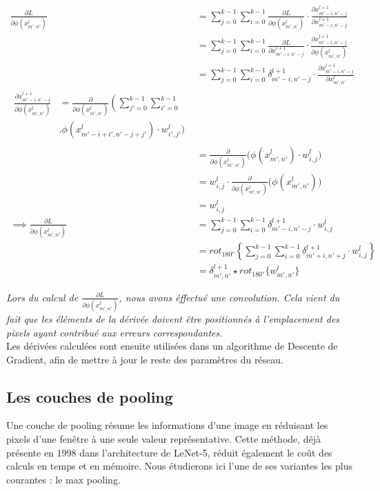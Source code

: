 \begin{multicols}{2}
{\scriptsize
\begin{align}
\frac{\partial L}{\partial\phi\left(x^{l}_{m',n'}\right)} &= \sum_{j=0}^{k-1}\sum_{i=0}^{k-1}\frac{\partial L}{\partial\phi\left(x^{l}_{m',n'}\right)}\cdot\frac{\partial x_{m'-i,n'-j}^{l+1}}{\partial x_{m'-i,n'-j}^{l+1}}\\
&= \sum_{j=0}^{k-1}\sum_{i=0}^{k-1}\frac{\partial L}{\partial x_{m'-i,n'-j}^{l+1}}\cdot\frac{\partial x_{m'-i,n'-j}^{l+1}}{\partial\phi\left(x^{l}_{m',n'}\right)}\\
&=   \sum_{j=0}^{k-1}\sum_{i=0}^{k-1}\delta^{l+1}_{m'-i,n'-j}\cdot\frac{\partial x_{m'-i,n'-j}^{l+1}}{\partial x_{m',n'}^{l}}\\
\begin{split}
    \frac{\partial x_{m'-i,n'-j}^{l+1}}{\partial\phi\left(x^{l}_{m',n'}\right)} &= \frac{\partial}{\partial\phi\left(x^{l}_{m',n'}\right)}\left( \sum_{j'=0}^{k-1}\sum_{i'=0}^{k-1}\right.  \\ 
    &  \biggl.\phi(x^{l}_{m'-i+i',n'-j+j'})  \cdot w^{l}_{i',j'}  \bigg)
\end{split} \\
&= \frac{\partial}{\partial\phi\left(x^{l}_{m',n'}\right)}\big(\phi(x^{l}_{m',n'})\cdot w^{l}_{i,j}\big)\\
&= w^{l}_{i,j}\cdot \frac{\partial}{\partial\phi\left(x^{l}_{m',n'}\right)}\big(\phi(x^{l}_{m',n'})\big)\\
&= w^{l}_{i,j}\\
\implies \frac{\partial L}{\partial\phi(x^{l}_{m',n'})} &=  \sum_{j=0}^{k-1}\sum_{i=0}^{k-1}\delta^{l+1}_{m'-i,n'-j}\cdot w^{l}_{i,j}\\
&= rot_{\ang{180}}\left \{ \sum_{j=0}^{k-1}\sum_{i=0}^{k-1}\delta^{l+1}_{m'+i,n'+j}\cdot w^{l}_{i,j} \right \} \\
& = \delta^{l+1}_{m',n'} \star rot_{\ang{180}}\{w^{l}_{m',n'}\}
\end{align}}

\textit{Lors du calcul de $\frac{\partial L}{\partial\phi\left(x^{l}_{m',n'}\right)}$, nous avons éffectué une convolution. 
Cela vient du fait que les éléments de la dérivée doivent être positionnés à l'emplacement des pixels 
ayant contribué aux erreurs correspondantes.}\\

Les dérivées calculées sont ensuite utilisées dans un algorithme de Descente de Gradient\cite{GradientDescent},
afin de mettre à jour le reste des paramètres du réseau.

\subsection{Les couches de pooling}
Une couche de pooling résume les informations d’une image en réduisant les pixels 
d’une fenêtre à une seule valeur représentative. Cette méthode, déjà présente en 1998 dans l'architecture de 
LeNet-5, réduit également le coût des calculs en temps et en mémoire. Nous étudierons 
ici l’une de ses variantes les plus courantes :  le max pooling. 


\end{multicols}
